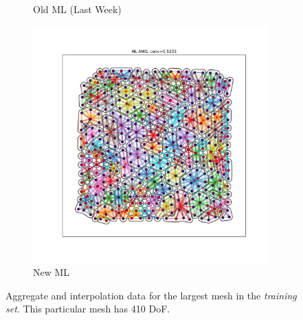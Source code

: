 \documentclass{article}
\begin{document}
\begin{figure}[h]
\begin{subfigure}[t]{0.32\textwidth}
    \caption{Old ML (Last Week)}
  \end{subfigure}
  \begin{subfigure}[t]{0.32\textwidth}
    \centering
    \includegraphics[width=\textwidth, trim=80 70 70 50, clip]{grid_largest_new.pdf}
    \caption{New ML}
  \end{subfigure}
  \caption{Aggregate and interpolation data for the largest mesh in the \textit{training set}.  This particular mesh has 410 DoF.}
  \label{fig:grid800}
\end{figure}




\end{document}
